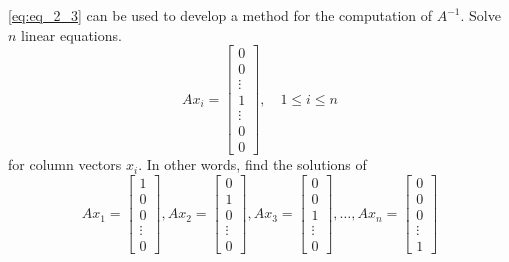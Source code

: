 \documentclass[../main.tex]{subfiles}
\begin{document}
\autoref{eq:eq_2_3} can be used to develop a method for the computation of $A^{-1}$. Solve $n$ linear equations.
$$
A x_{i}=\left[\begin{array}{c}
0 \\
0 \\
\vdots \\
1 \\
\vdots \\
0 \\
0
\end{array}\right], \quad 1 \leq i \leq n
$$
for column vectors $x_{i} .$ In other words, find the solutions of
$$
A x_{1}=\left[\begin{array}{c}
1 \\
0 \\
0 \\
\vdots \\
0
\end{array}\right], A x_{2}=\left[\begin{array}{c}
0 \\
1 \\
0 \\
\vdots \\
0
\end{array}\right], A x_{3}=\left[\begin{array}{c}
0 \\
0 \\
1 \\
\vdots \\
0
\end{array}\right], \ldots, A x_{n}=\left[\begin{array}{c}
0 \\
0 \\
0 \\
\vdots \\
1
\end{array}\right]
$$
\end{document}
